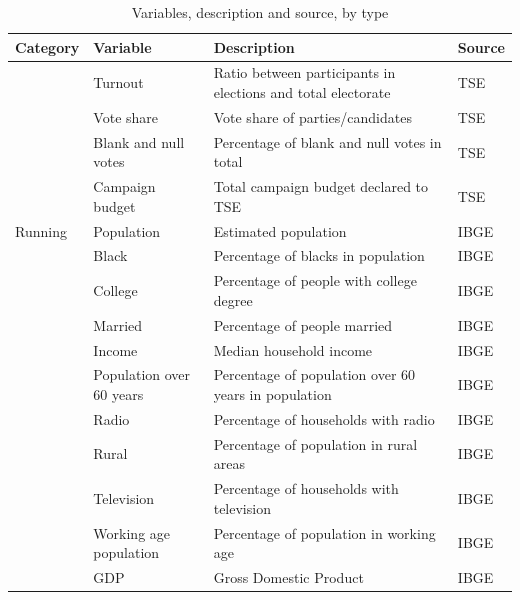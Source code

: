 \documentclass[
  12pt,
]{article}
\begin{document}
\begin{table}[!h]

\caption{\label{tab:variables}Variables, description and source, by type}
\centering
\fontsize{9}{11}\selectfont
\begin{tabu} to 
\toprule
Category & Variable & Description & Source\\
\midrule
 & Turnout & Ratio between participants in elections and total electorate & TSE\\

 & Vote share & Vote share of parties/candidates & TSE\\

 & Blank and null votes & Percentage of blank and null votes in total & TSE\\

 & Campaign budget & Total campaign budget declared to TSE & TSE\\
Running & Population & Estimated population & IBGE\\
 & Black & Percentage of blacks in population & IBGE\\

 & College & Percentage of people with college degree & IBGE\\

 & Married & Percentage of people married & IBGE\\

 & Income & Median household income & IBGE\\

 & Population over 60 years & Percentage of population over 60 years in population & IBGE\\

 & Radio & Percentage of households with radio & IBGE\\

 & Rural & Percentage of population in rural areas & IBGE\\

 & Television & Percentage of households with television & IBGE\\

 & Working age population & Percentage of population in working age & IBGE\\

 & GDP & Gross Domestic Product & IBGE\\


\end{tabu}
\end{table}
\end{document}

